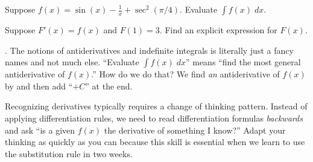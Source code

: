 \documentclass[../main.tex]{subfiles}
\begin{document}
\begin{example}
  Suppose \(f(x) = \sin(x) - \frac{1}{x} + \sec^{2}(\pi/4)\). Evaluate \(\int f(x) \;dx\). 

  Suppose \(F'(x) = f(x)\) and \(F(1) = 3\). Find an explicit expression for \(F(x)\).

\end{example}

. The notions of antiderivatives and indefinite integrals is literally just a fancy names and not much else. ``Evaluate \(\textstyle \int f(x) \;dx\)'' means ``find the most general antiderivative of \(f(x)\).'' How do we do that? We find \emph{an} antiderivative of \(f(x)\) by  and then add ``\(+ C\)'' at the end.

Recognizing derivatives typically requires a change of thinking pattern. Instead of applying differentiation rules, we need to read differentiation formulas \emph{backwards} and ask ``is a given \(f(x)\) the derivative of something I know?'' Adapt your thinking as quickly as you can because this skill is essential when we learn to use the substitution rule in two weeks.

\clearpage
\end{document}
